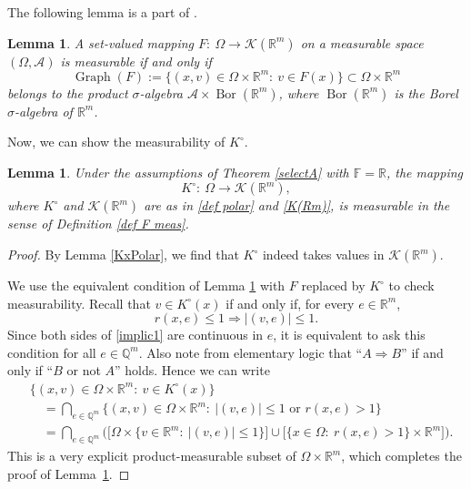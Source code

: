 \documentclass[11pt, reqno]{amsart}
\newtheorem{lemma}[theorem]{Lemma}
\theoremstyle{definition}
\theoremstyle{remark}
\numberwithin{equation}{section}
\newcommand{\As}{\mathcal A}
\newcommand{\F}{\mathbb F}
\newcommand{\Q}{\mathbb Q}
\newcommand{\R}{\mathbb R}
\newcommand{\abs}[1]{|#1|}
\begin{document}
The following lemma is a part of \cite[Theorem 8.1.4]{AF09}.

\begin{lemma}\label{equiv F meas}
A set-valued mapping $F:\ \Omega\to\mathcal K(\R^m)$
on a measurable space $(\Omega,\As)$ is measurable if and only if
\begin{equation*}
\operatorname{Graph}(F)
:=\{(x,v)\in\Omega\times\R^m:\ v\in F(x)\}\subset\Omega\times\R^m
\end{equation*}
belongs to the product $\sigma$-algebra
$\As\times\operatorname{Bor}(\R^m)$,
where $\operatorname{Bor}(\mathbb R^m)$
is the Borel $\sigma$-algebra of $\mathbb R^m$.
\end{lemma}

Now, we can show the measurability of $K^\circ$.

\begin{lemma}\label{KxPolMes}
Under the assumptions of Theorem \ref{selectA} with $\F=\R$, the mapping
\begin{equation*}
K^{\circ}:\ \Omega\to\mathcal K(\R^m),
\end{equation*}
where $K^\circ$ and $\mathcal K(\R^m)$
are as in \eqref{def polar} and \eqref{K(Rm)},
is measurable in the sense of Definition \ref{def F meas}.
\end{lemma}

\begin{proof}
By Lemma \ref{KxPolar}, we find that $K^\circ$
indeed takes values in $\mathcal K(\R^m)$.

We use the equivalent condition of Lemma \ref{equiv F meas}
with $F$ replaced by $K^\circ$ to check measurability.
Recall that $v\in K^\circ(x)$ if and only if,
for every $e\in\R^m$,
\begin{equation}\label{implic1}
r(x,e)\leq 1\Rightarrow\abs{(v,e)}\leq 1.
\end{equation}
Since both sides of \eqref{implic1} are continuous in $e$,
it is equivalent to ask this condition for all $e\in\Q^m$.
Also note from elementary logic that ``$A\Rightarrow B$''
if and only if ``$B$ or not $A$'' holds.
Hence we can write
\begin{align*}
&\{(x,v)\in\Omega\times\R^m:\ v\in K^\circ(x)\} \\
&\quad=\bigcap_{e\in\Q^m} \{ (x,v)\in\Omega\times\R^m :\
\abs{(v,e)}\leq 1 \text{ or } r(x,e)>1 \} \\
&\quad=\bigcap_{e\in\Q^m}\Big(
\Big[\Omega\times\{v\in\R^m:\ \abs{(v,e)}\leq 1\}\Big]
\cup\Big[\{ x\in\Omega:\ r(x,e)>1 \}\times\R^m\Big]\Big).
\end{align*}
This is a very explicit product-measurable subset of $\Omega\times\R^m$,
which completes the proof of Lemma~\ref{KxPolMes}.
\end{proof}
\end{document}
